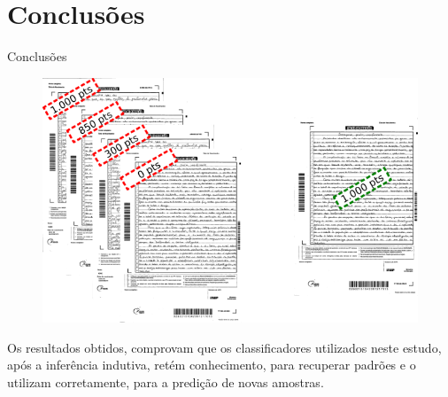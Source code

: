 \section{Conclusões}
  \begin{frame}[fragile]{Conclusões}
    \begin{figure}[H]
        \begin{center}
            \includegraphics[scale=0.50]{images/conclusao.png}
        \end{center}
    \end{figure}
  Os resultados obtidos, comprovam que os classificadores utilizados neste 
  estudo, após a inferência indutiva, retém conhecimento, para recuperar 
  padrões e o utilizam corretamente, para a predição de novas amostras.
  \end{frame}